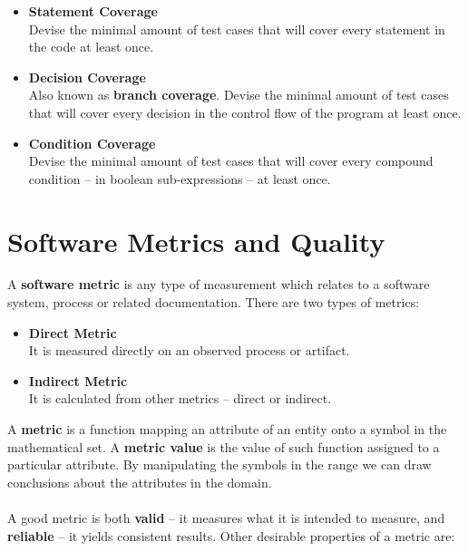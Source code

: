 \documentclass{article}
\begin{document}
\begin{itemize}
	\item \textbf{Statement Coverage}
	\vspace{.2cm} \\
	Devise the minimal amount of test cases that will cover every statement in the code at least once.
	
	\item \textbf{Decision Coverage}
	\vspace{.2cm} \\
	Also known as \textbf{branch coverage}. Devise the minimal amount of test cases that will cover every decision in the control flow of the program at least once.
	
	\item \textbf{Condition Coverage}
	\vspace{.2cm} \\
	Devise the minimal amount of test cases that will cover every compound condition -- in boolean sub-expressions -- at least once.
\end{itemize}

\section{Software Metrics and Quality}
A \textbf{software metric} is any type of measurement which relates to a software system, process or related documentation. There are two types of metrics:

\begin{itemize}
	\item \textbf{Direct Metric}
	\vspace{.2cm} \\
	It is measured directly on an observed process or artifact.
	
	\item \textbf{Indirect Metric}
	\vspace{.2cm} \\
	It is calculated from other metrics -- direct or indirect.
\end{itemize}
A \textbf{metric} is a function mapping an attribute of an entity onto a symbol in the mathematical set. A \textbf{metric value} is the value of such function assigned to a particular attribute. By manipulating the symbols in the range we can draw conclusions about the attributes in the domain. \\ \\
A good metric is both \textbf{valid} -- it measures what it is intended to measure, and \textbf{reliable} -- it yields consistent results. Other desirable properties of a metric are:
\end{document}
